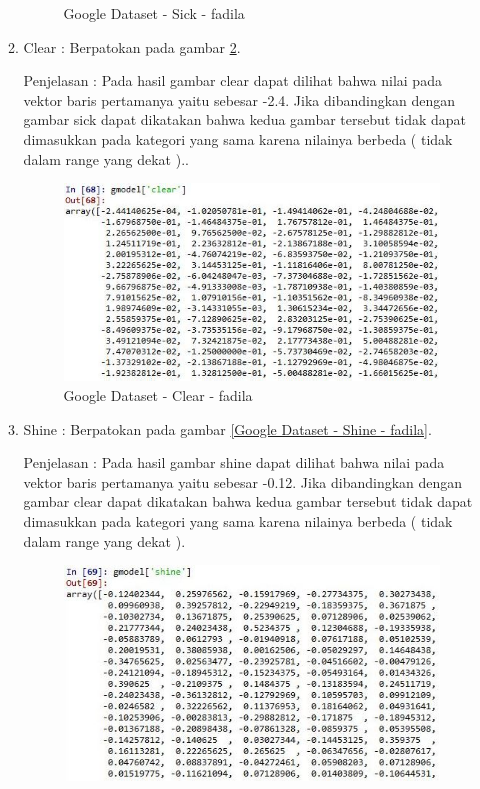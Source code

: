 \begin{enumerate}
\begin{enumerate}
\begin{figure}[!hbtp]
\caption{Google Dataset - Sick - fadila}
\label{Google Dataset - Sick - fadila}
\end{figure}
\par
\item Clear :  Berpatokan pada gambar \ref{Google Dataset - Clear - fadila}.
\par Penjelasan : Pada hasil gambar clear dapat dilihat bahwa nilai pada vektor baris pertamanya yaitu sebesar -2.4. Jika dibandingkan dengan gambar sick dapat dikatakan bahwa kedua gambar tersebut tidak dapat dimasukkan pada kategori yang sama  karena nilainya berbeda ( tidak dalam range yang dekat )..
\par
\begin{figure}[!hbtp]
\centering
\includegraphics[scale=0.3]{figures/1-clear-fadila.jpg}
\caption{Google Dataset - Clear - fadila}
\label{Google Dataset - Clear - fadila}
\end{figure}
\par
\item Shine : Berpatokan pada gambar \ref{Google Dataset - Shine - fadila}.
\par Penjelasan : Pada hasil gambar shine dapat dilihat bahwa nilai pada vektor baris pertamanya yaitu sebesar -0.12. Jika dibandingkan dengan gambar clear dapat dikatakan bahwa kedua gambar tersebut tidak dapat dimasukkan pada kategori yang sama karena nilainya berbeda ( tidak dalam range yang dekat ).
\par
\begin{figure}[!hbtp]
\centering
\includegraphics[scale=0.3]{figures/1-shine-fadila.jpg}

\end{figure}
\end{enumerate}
\end{enumerate}
